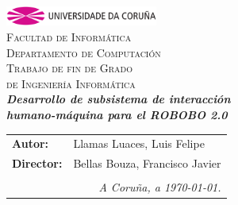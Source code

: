 \begin{titlepage}
\begin{center}
\includegraphics[width=5cm]{imagenes/anagramaUDC.png}\\[0.5cm]
{\textsc{Facultad de Informática}} \\
{\large \textsc{Departamento de Computación}} \\[1cm]
{\Large \textsc{Trabajo de fin de Grado}} \\
{\Large \textsc{de Ingeniería Informática}} \\[2cm]
{\Large \textsl{\textbf{Desarrollo de subsistema de interacción  }}} \\[0.15cm]
{\Large \textsl{\textbf{humano-máquina para el ROBOBO 2.0}}} \\

\vfill
\begin{flushright}
\begin{tabular}{ll}
\textbf{Autor:}    & Llamas Luaces, Luis Felipe \\
\textbf{Director:} & Bellas Bouza, Francisco Javier \\
& \\
\multicolumn{2}{r}{\small \emph{A Coruña, a \today{}.}} \\
\end{tabular}
\end{flushright}
\end{center}
\end{titlepage}
